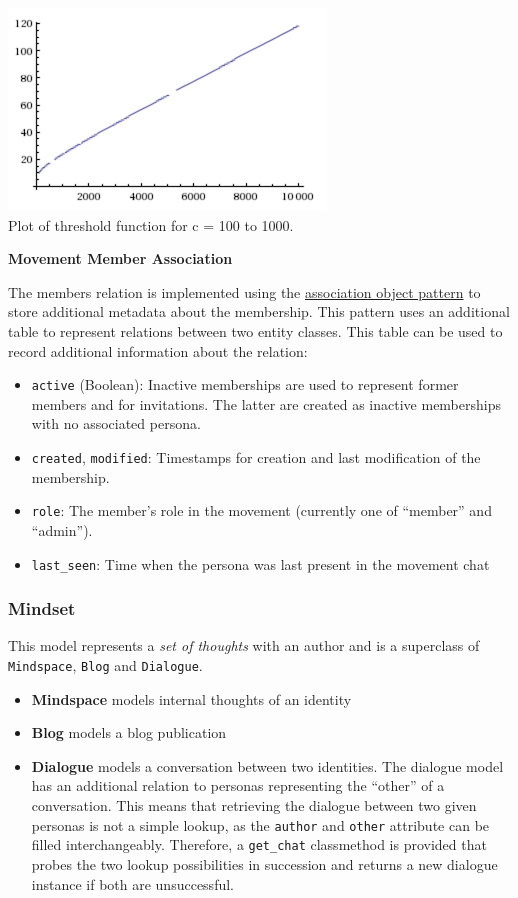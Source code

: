 \includegraphics{img/threshold_2.png}\\
 Plot of threshold function for c = 100 to 1000.

\textbf{Movement Member Association}

The members relation is implemented using the
\href{http://docs.sqlalchemy.org/en/rel_1_0/orm/basic_relationships.html\#association-object}{association
object pattern} to store additional metadata about the membership. This
pattern uses an additional table to represent relations between two
entity classes. This table can be used to record additional information
about the relation:

\begin{itemize}
\tightlist
\item
  \texttt{active} (Boolean): Inactive memberships are used to represent
  former members and for invitations. The latter are created as inactive
  memberships with no associated persona.
\item
  \texttt{created}, \texttt{modified}: Timestamps for creation and last
  modification of the membership.
\item
  \texttt{role}: The member's role in the movement (currently one of
  ``member'' and ``admin'').
\item
  \texttt{last\_seen}: Time when the persona was last present in the
  movement chat
\end{itemize}

\subsubsection{Mindset}\label{mindset}

This model represents a \emph{set of thoughts} with an author and is a
superclass of \texttt{Mindspace}, \texttt{Blog} and \texttt{Dialogue}.

\begin{itemize}
\tightlist
\item
  \textbf{Mindspace} models internal thoughts of an identity
\item
  \textbf{Blog} models a blog publication
\item
  \textbf{Dialogue} models a conversation between two identities. The
  dialogue model has an additional relation to personas representing the
  ``other'' of a conversation. This means that retrieving the dialogue
  between two given personas is not a simple lookup, as the
  \texttt{author} and \texttt{other} attribute can be filled
  interchangeably. Therefore, a \texttt{get\_chat} classmethod is
  provided that probes the two lookup possibilities in succession and
  returns a new dialogue instance if both are unsuccessful.
\end{itemize}

